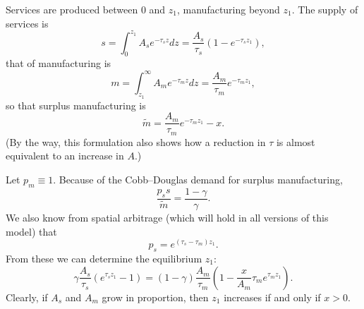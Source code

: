 \documentclass[letter]{amsart}
\theoremstyle{definition}
\theoremstyle{remark}
\numberwithin{equation}{section}
\begin{document}
Services are produced between 0 and $z_1$, manufacturing beyond $z_1$. The supply of services is 
\[
s = \int_{0}^{z_1}A_s e^{-\tau_s z} dz = \frac{A_s}{\tau_s}\left(1-e^{-\tau_s z_1}\right),
\]
that of manufacturing is
\[
m = \int_{z_1}^\infty A_m e^{-\tau_m z} dz = \frac{A_m}{\tau_m}e^{-\tau_m z_1},
\]
so that surplus manufacturing is
\[
\tilde m = \frac{A_m}{\tau_m}e^{-\tau_m z_1} - x.
\]
(By the way, this formulation also shows how a reduction in $\tau$ is almost equivalent to an increase in $A$.)

Let $p_m\equiv 1$. Because of the Cobb--Douglas demand for surplus manufacturing,
\[
\frac{p_s s}{\tilde m} = \frac{1-\gamma}{\gamma}.
\]
We also know from spatial arbitrage (which will hold in all versions of this model) that
\[
p_s = e^{(\tau_s-\tau_m)z_1}.
\]
From these we can determine the equilibrium $z_1$:
\begin{equation}\label{eq:equ}
    \gamma \frac{A_s}{\tau_s}\left(e^{\tau_s z_1}-1\right) = 
    (1-\gamma) \frac{A_m}{\tau_m}\left(1-\frac{x}{A_m}\tau_me^{\tau_m z_1}\right).
\end{equation}
Clearly, if $A_s$ and $A_m$ grow in proportion, then $z_1$ increases if and only if $x>0$. 
\end{document}
